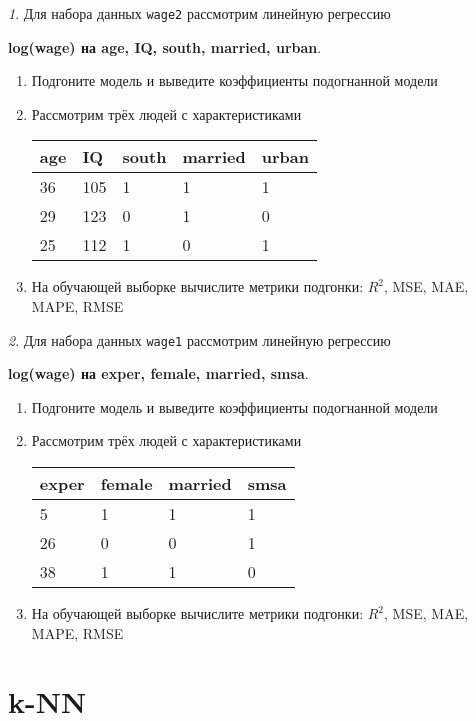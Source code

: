 \documentclass[12pt]{article}
\theoremstyle{remark}
\newtheorem{exercise}{}[section]
\begin{document}
\begin{exercise}
Для набора данных \texttt{wage2} рассмотрим линейную регрессию 
\begin{center}
	\textbf{log(wage) на age, IQ, south, married, urban}.
\end{center}
\begin{enumerate}
	\item Подгоните модель и выведите коэффициенты подогнанной модели
	\item Рассмотрим трёх людей с характеристиками
	\begin{center}
			\begin{tabular}{|l|l|l|l|l|}\hline
				age & IQ & south & married & urban \\ \hline\hline
				36 & 105 & 1 & 1 & 1 \\
				29 & 123 & 0 & 1 & 0 \\
				25 & 112 & 1 & 0 & 1 \\ \hline
			\end{tabular}
		\end{center}
	\item На обучающей выборке вычислите метрики подгонки: \(R^2\), 
	MSE, MAE, MAPE, RMSE
\end{enumerate}
\end{exercise}

\begin{exercise}
Для набора данных \texttt{wage1} рассмотрим линейную регрессию 
\begin{center}
	\textbf{log(wage) на exper, female, married, smsa}.
\end{center}
\begin{enumerate}
	\item Подгоните модель и выведите коэффициенты подогнанной модели
	\item Рассмотрим трёх людей с характеристиками
	\begin{center}
			\begin{tabular}{|l|l|l|l|}\hline
				exper & female & married & smsa \\ \hline\hline
				5 & 1 & 1 & 1  \\
				26 & 0 & 0 & 1 \\
				38 & 1 & 1 & 0 \\ \hline
			\end{tabular}
		\end{center}
	\item На обучающей выборке вычислите метрики подгонки: \(R^2\), 
	MSE, MAE, MAPE, RMSE
\end{enumerate}
\end{exercise}

\section{k-NN}
\end{document}
